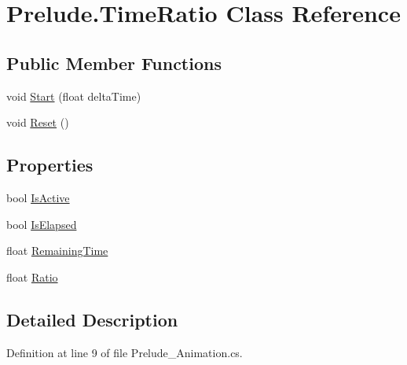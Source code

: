 \hypertarget{class_prelude_1_1_time_ratio}{\section{Prelude.\+Time\+Ratio Class Reference}
\label{class_prelude_1_1_time_ratio}
}
\subsection*{Public Member Functions}
\begin{DoxyCompactItemize}
\item 
void \hyperlink{class_prelude_1_1_time_ratio_a5246e73c291f7caef0b21de1b8d2d3fb}{Start} (float delta\+Time)
\item 
void \hyperlink{class_prelude_1_1_time_ratio_ae8da07625a757fdcea6307431cc0bbc6}{Reset} ()
\end{DoxyCompactItemize}
\subsection*{Properties}
\begin{DoxyCompactItemize}
\item 
bool \hyperlink{class_prelude_1_1_time_ratio_a5fd2de99b6fd5130e4b4ea9d443fed8e}{Is\+Active}
\item 
bool \hyperlink{class_prelude_1_1_time_ratio_a567bf1260287d1d3fe84ec656a281fb5}{Is\+Elapsed}
\item 
float \hyperlink{class_prelude_1_1_time_ratio_a58e22f53e3d2902ec6d58a136aee876c}{Remaining\+Time}
\item 
float \hyperlink{class_prelude_1_1_time_ratio_a883b17811a61925028b37abce3f2ab32}{Ratio}
\end{DoxyCompactItemize}


\subsection{Detailed Description}


Definition at line 9 of file Prelude\+\_\+\+Animation.\+cs.



